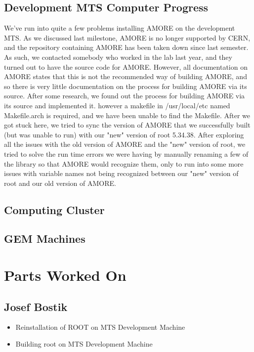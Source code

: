 \documentclass[12pt]{article}
\newcommand\tab[1][1cm]{\hspace*{#1}}
\begin{document}
\tab 

\subsection{Development MTS Computer Progress}

\tab We've run into quite a few problems installing AMORE on the development MTS.
	As we discussed last milestone, AMORE is no longer supported by CERN, and
	the repository containing AMORE has been taken down since last semester. As
	such, we contacted somebody who worked in the lab last year, and they turned
	out to have the source code for AMORE. However, all documentation on AMORE states
	that this is not the recommended way of building AMORE, and so there is very
	little documentation on the process for building AMORE via its source. After some
	research, we found out the process for building AMORE via its source and 
	implemented it. however a makefile in /usr/local/etc named Makefile.arch is 
	required, and we have been unable to find the Makefile. After we got 
	stuck here, we tried to sync the version of AMORE that we successfully built 
	(but was unable to run) with our "new" version of root 5.34.38. 
	After exploring all the issues with the old version of AMORE and the "new" 
	version of root, we tried to solve the run  time errors we were having 
	by manually renaming a few of the library so that AMORE
	would recognize them, only to run into some more issues with variable names 
	not being recognized between our "new" version of root and our old version
	of AMORE.

\subsection{Computing Cluster}

\tab 

\subsection{GEM Machines}

\tab 
\section{Parts Worked On}

\subsection{Josef Bostik}

\begin{itemize}
\item Reinstallation of ROOT on MTS Development Machine
\item Building root on MTS Development Machine
\end{itemize}
\end{document}
